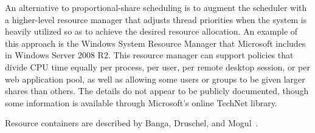 An alternative to proportional-share scheduling is to augment the scheduler with a higher-level resource manager that adjusts
thread priorities when the system is heavily utilized so as to achieve the desired resource allocation.  An example of this
approach is the Windows System Resource Manager that Microsoft includes in Windows Server 2008 R2.  This resource manager
can support policies that divide CPU time equally per process, per user, per remote desktop session, or per web application pool, as well as allowing some users or groups to be given larger shares than others.  The details do not appear to be publicly documented,
though some information is available through Microsoft's online TechNet library.


Resource containers are described by
Banga, Druschel, and
Mogul~\cite{max986}.
